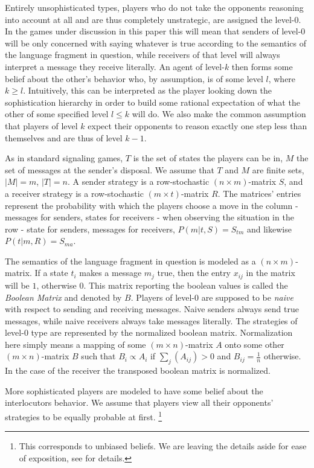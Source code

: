 \documentclass[10pt]{article}
\begin{document}
Entirely unsophisticated types, players who do not take the opponents reasoning into account at all and are thus completely unstrategic, are assigned the level-0. In the games under discussion in this paper this will mean that senders of level-0 will be only concerned with saying whatever is true according to the semantics of the language fragment in question, while receivers of that level will always interpret a message they receive literally. An agent of level-$k$ then forms some belief about the other's behavior who, by assumption, is of some level $l$, where $k\geq l$. Intuitively, this can be interpreted as the player looking down the sophistication hierarchy in order to build some rational expectation of what the other of some specified level $l\leq k$ will do. We also make the common assumption that players of level $k$ expect their opponents to reason exactly one step less than themselves and are thus of level $k-1$.

As in standard signaling games, $T$ is the set of states the players can be in, $M$ the set of messages at the sender's disposal. We assume that $T$ and $M$ are finite sets, $|M|=m$, $|T|=n$. A sender strategy is a row-stochastic $(n \times m)$-matrix $S$, and a receiver strategy is a row-stochastic $(m\times t)$-matrix $R$.
The matrices' entries represent the probability with which the players choose a move in the column - messages for senders, states for receivers - when observing the situation in the row - state for senders, messages for receivers, $P(m|t,S) = S_{tm}$ and likewise $P(t|m,R) = S_{ma}$.

The semantics of the language fragment in question is modeled as a $(n \times m)$-matrix. If a state $t_i$ makes a message $m_j$ true, then the entry $x_{ij}$ in the matrix will be $1$, otherwise $0$. This matrix reporting the boolean values is called the \textit{Boolean Matrix} and denoted by $B$.
Players of level-0 are supposed to be \textit{naive} with respect to sending and receiving messages. Naive senders always send true messages, while naive receivers always take messages literally.
The strategies of level-0 type are represented by the normalized boolean matrix. Normalization here simply means a mapping of some $(m\times n)$-matrix $A$ onto some other $(m\times n)$-matrix $B$ such that $B_i\propto A_i$ if $\sum_j (A_{ij})>0$ and $B_{ij}=\tfrac{1}{n}$ otherwise. In the case of the receiver the transposed boolean matrix is normalized.

More sophisticated players are modeled to have some belief about the interlocutors behavior. We assume that players view all their opponents' strategies to be equally probable at first. \footnote{This corresponds to unbiased beliefs. We are leaving the details aside for ease of exposition, see \cite{franke2013pragmatic} for details.}
\end{document}
